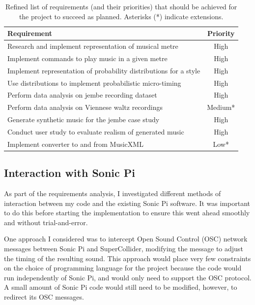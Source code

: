\documentclass[12pt,twoside,openright]{report}
\begin{document}
\begin{table}[ht]
\centering
\begin{tabularx}{400pt}{Xc}
    \toprule
    \textbf{Requirement}                                      & \textbf{Priority} \\
    \midrule
    Research and implement representation of musical metre              & High \\
    Implement commands to play music in a given metre                   & High \\
    Implement representation of probability distributions for a style   & High \\
    Use distributions to implement probabilistic micro-timing           & High \\
    Perform data analysis on jembe recording dataset                    & High \\
    Perform data analysis on Viennese waltz recordings                  & Medium* \\
    Generate synthetic music for the jembe case study                   & High \\
    Conduct user study to evaluate realism of generated music           & High \\
    Implement converter to and from MusicXML                            & Low* \\
    \bottomrule
\end{tabularx}
\caption{Refined list of requirements (and their priorities) that should be achieved for the project to succeed as planned. Asterisks (*) indicate extensions.}
\label{table:requirements}
\end{table}


\subsection{Interaction with Sonic Pi}

As part of the requirements analysis, I investigated different methods of
interaction between my code and the existing Sonic Pi software. It was important
to do this before starting the implementation to ensure this went ahead smoothly
and without trial-and-error.

One approach I considered was to intercept Open Sound Control (OSC) network
messages between Sonic Pi and SuperCollider, modifying the message to adjust the timing of the resulting sound. This approach would place very few constraints on the choice of programming language for the project because the code would run independently of Sonic Pi, and would only need to support the OSC protocol. A small amount of Sonic Pi code would still need to be modified, however, to redirect its OSC messages.
\end{document}
